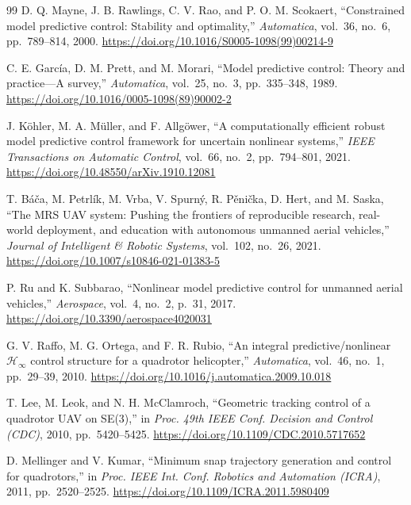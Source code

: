 \documentclass[12pt,a4paper]{report}
\begin{document}
\begin{thebibliography}{99}
 D. Q. Mayne, J. B. Rawlings, C. V. Rao, and P. O. M. Scokaert, ``Constrained model predictive control: Stability and optimality,'' \emph{Automatica}, vol.~36, no.~6, pp.~789--814, 2000. \href{https://doi.org/10.1016/S0005-1098(99)00214-9}{https://doi.org/10.1016/S0005-1098(99)00214-9}

 C. E. Garc\'ia, D. M. Prett, and M. Morari, ``Model predictive control: Theory and practice---A survey,'' \emph{Automatica}, vol.~25, no.~3, pp.~335--348, 1989. \href{https://doi.org/10.1016/0005-1098(89)90002-2}{https://doi.org/10.1016/0005-1098(89)90002-2}

 J. K\"ohler, M. A. M\"uller, and F. Allg\"ower, ``A computationally efficient robust model predictive control framework for uncertain nonlinear systems,'' \emph{IEEE Transactions on Automatic Control}, vol.~66, no.~2, pp.~794--801, 2021. \href{https://doi.org/10.48550/arXiv.1910.12081}{https://doi.org/10.48550/arXiv.1910.12081}

 T. B\'a\v{c}a, M. Petrl\'ik, M. Vrba, V. Spurn\'y, R. P\v{e}ni\v{c}ka, D. Hert, and M. Saska, ``The MRS UAV system: Pushing the frontiers of reproducible research, real-world deployment, and education with autonomous unmanned aerial vehicles,'' \emph{Journal of Intelligent \& Robotic Systems}, vol.~102, no.~26, 2021. \href{https://doi.org/10.1007/s10846-021-01383-5}{https://doi.org/10.1007/s10846-021-01383-5}

 P. Ru and K. Subbarao, ``Nonlinear model predictive control for unmanned aerial vehicles,'' \emph{Aerospace}, vol.~4, no.~2, p.~31, 2017. \href{https://doi.org/10.3390/aerospace4020031}{https://doi.org/10.3390/aerospace4020031}

 G. V. Raffo, M. G. Ortega, and F. R. Rubio, ``An integral predictive/nonlinear $\mathcal{H}_\infty$ control structure for a quadrotor helicopter,'' \emph{Automatica}, vol.~46, no.~1, pp.~29--39, 2010. \href{https://doi.org/10.1016/j.automatica.2009.10.018}{https://doi.org/10.1016/j.automatica.2009.10.018}

 T. Lee, M. Leok, and N. H. McClamroch, ``Geometric tracking control of a quadrotor UAV on SE(3),'' in \emph{Proc. 49th IEEE Conf. Decision and Control (CDC)}, 2010, pp.~5420--5425. \href{https://doi.org/10.1109/CDC.2010.5717652}{https://doi.org/10.1109/CDC.2010.5717652}

 D. Mellinger and V. Kumar, ``Minimum snap trajectory generation and control for quadrotors,'' in \emph{Proc. IEEE Int. Conf. Robotics and Automation (ICRA)}, 2011, pp.~2520--2525. \href{https://doi.org/10.1109/ICRA.2011.5980409}{https://doi.org/10.1109/ICRA.2011.5980409}


\end{thebibliography}
\end{document}

